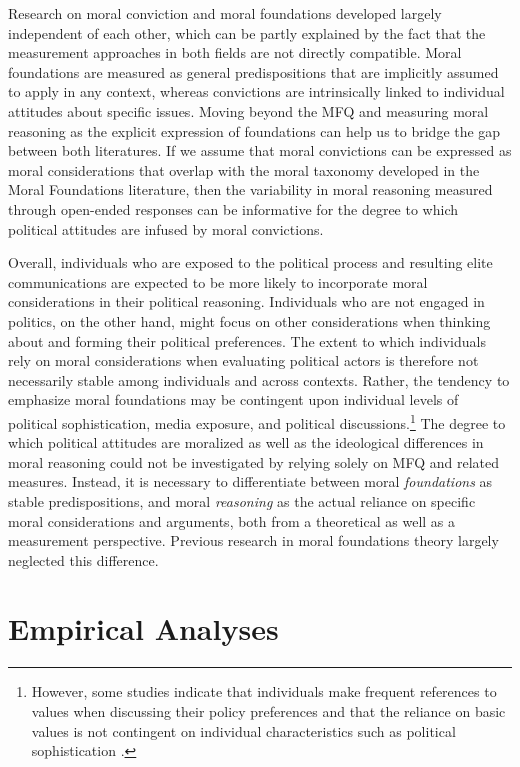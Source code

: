 \documentclass[12pt]{article}
\begin{document}
Research on moral conviction and moral foundations developed largely independent of each other, which can be partly explained by the fact that the measurement approaches in both fields are not directly compatible. Moral foundations are measured as general predispositions that are implicitly assumed to apply in any context, whereas convictions are intrinsically linked to individual attitudes about specific issues. Moving beyond the MFQ and measuring moral reasoning as the explicit expression of foundations can help us to bridge the gap between both literatures. If we assume that moral convictions can be expressed as moral considerations that overlap with the moral taxonomy developed in the Moral Foundations literature, then the variability in moral reasoning measured through open-ended responses can be informative for the degree to which political attitudes are infused by moral convictions.

Overall, individuals who are exposed to the political process and resulting elite communications are expected to be more likely to incorporate moral considerations in their political reasoning. Individuals who are not engaged in politics, on the other hand, might focus on other considerations when thinking about and forming their political preferences. The extent to which individuals rely on moral considerations when evaluating political actors is therefore not necessarily stable among individuals and across contexts. Rather, the tendency to emphasize moral foundations may be contingent upon individual levels of political sophistication, media exposure, and political discussions.\footnote{However, some studies indicate that individuals make frequent references to values when discussing their policy preferences \citep{feldman1992political} and that the reliance on basic values is not contingent on individual characteristics such as political sophistication \citep[e.g.][]{goren2001core,goren2004political,marietta2007values}.} The degree to which political attitudes are moralized as well as the ideological differences in moral reasoning could not be investigated by relying solely on MFQ and related measures. Instead, it is necessary to differentiate between moral \textit{foundations} as stable predispositions, and moral \textit{reasoning} as the actual reliance on specific moral considerations and arguments, both from a theoretical as well as a measurement perspective. Previous research in moral foundations theory largely neglected this difference.



\section{Empirical Analyses}
\end{document}
